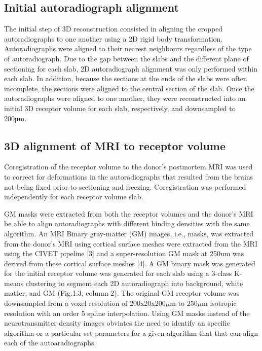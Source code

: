 \documentclass[12pt]{article}
\begin{document}
\subsection{Initial autoradiograph alignment}
    The initial step of 3D reconstruction consisted in aligning the cropped autoradiographs to one another using a 2D rigid body transformation. Autoradiographs were aligned to their nearest neighbours regardless of the type of autoradiograph. Due to the gap between the slabs and the different plane of sectioning for each slab, 2D autoradiograph alignment was only performed within each slab. In addition, because the sections at the ends of the slabs were often incomplete, the sections were aligned to the central section of the slab.  Once the autoradiographs were aligned to one another, they were reconstructed into an initial 3D receptor volume for each slab, respectively, and downsampled to 200μm. 


\subsection{ 3D alignment of MRI to receptor volume }
    Coregistration of the receptor volume to the donor's postmortem MRI was used to correct for deformations in the autoradiographs that resulted from the brains not being fixed prior to sectioning and freezing. Coregistration was performed independently for each receptor volume slab. 
    
    GM masks were extracted from both the receptor volumes and the donor's MRI be able to align autoradiographs with different binding densities with the same algorithm. An MRI Binary gray-matter (GM) images, i.e., masks, was extracted from the donor's MRI using cortical surface meshes were extracted from the MRI using the CIVET pipeline [3] and a super-resolution GM mask at 250um was derived from these cortical surface meshes [4]. A GM binary mask was generated for the initial receptor volume was generated for each slab using a 3-class K-means clustering to segment each 2D autoradiograph into background, white matter, and GM (Fig.1.3, column 2). The original GM receptor volume was downsampled from a voxel resolution of 200x20x200$\mu$m to 250$\mu$m isotropic resolution with an order 5 spline interpolation. Using GM masks instead of the neurotransmitter density images obviates the need to identify an specific algorithm or a particular set parameters for a given algorithm that that can align each of the autoaradiographs. 
    
\end{document}
